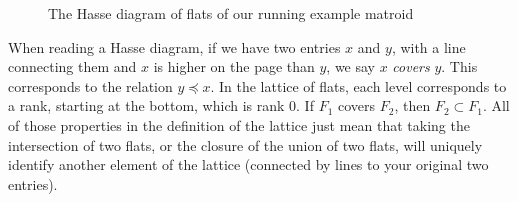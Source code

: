 \documentclass[12pt,oneside]{../../sfsuthesis}
\begin{document}
\begin{figure}[H]
    \centering
    \caption{The Hasse diagram of flats of our running example matroid}
\end{figure}

When reading a Hasse diagram, if we have two entries \( x \) and \( y \), with a line connecting them and \( x \) is higher on the page than \( y \), we say \( x \) \emph{covers} \( y \).
This corresponds to the relation \( y \preceq x \).
In the lattice of flats, each level corresponds to a rank, starting at the bottom, which is rank 0.
If \( F_1 \) covers \( F_2 \), then \( F_2 \subset F_1 \).
All of those properties in the definition of the lattice just mean that taking the intersection of two flats, or the closure of the union of two flats, will uniquely identify another element of the lattice (connected by lines to your original two entries).
\end{document}

